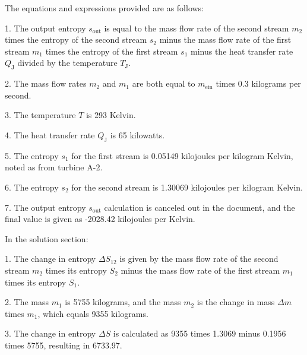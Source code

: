 The equations and expressions provided are as follows:

1. The output entropy \( s_{\text{out}} \) is equal to the mass flow rate of the second stream \( m_2 \) times the entropy of the second stream \( s_2 \) minus the mass flow rate of the first stream \( m_1 \) times the entropy of the first stream \( s_1 \) minus the heat transfer rate \( Q_{\text{J}} \) divided by the temperature \( T_{\text{J}} \).

2. The mass flow rates \( m_2 \) and \( m_1 \) are both equal to \( m_{\text{ein}} \) times 0.3 kilograms per second.

3. The temperature \( T \) is 293 Kelvin.

4. The heat transfer rate \( Q_{\text{J}} \) is 65 kilowatts.

5. The entropy \( s_1 \) for the first stream is 0.05149 kilojoules per kilogram Kelvin, noted as from turbine A-2.

6. The entropy \( s_2 \) for the second stream is 1.30069 kilojoules per kilogram Kelvin.

7. The output entropy \( s_{\text{out}} \) calculation is canceled out in the document, and the final value is given as -2028.42 kilojoules per Kelvin.

In the solution section:

1. The change in entropy \( \Delta S_{12} \) is given by the mass flow rate of the second stream \( m_2 \) times its entropy \( S_2 \) minus the mass flow rate of the first stream \( m_1 \) times its entropy \( S_1 \).

2. The mass \( m_1 \) is 5755 kilograms, and the mass \( m_2 \) is the change in mass \( \Delta m \) times \( m_1 \), which equals 9355 kilograms.

3. The change in entropy \( \Delta S \) is calculated as 9355 times 1.3069 minus 0.1956 times 5755, resulting in 6733.97.
